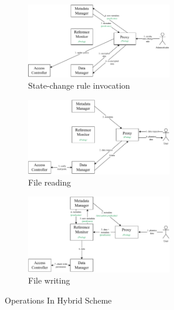 

\begin{figure}[t!]
    \centering

    \begin{subfigure}{\textwidth}
        \centering
        \includegraphics[width=0.7\textwidth]{assets/img2/hybrid_admin.pdf}
        \caption{State-change rule invocation}
        \label{fig:hybrid_structure.admin}
    \end{subfigure}
    \par\bigskip
    \begin{subfigure}{\textwidth}
        \centering
        \includegraphics[width=0.7\textwidth]{assets/img2/hybrid_read.pdf}
        \caption{File reading}
        \label{fig:hybrid_structure.read}
    \end{subfigure}
    \par\bigskip
    \begin{subfigure}{\textwidth}
        \centering
        \includegraphics[width=0.7\textwidth]{assets/img2/hybrid_write.pdf}
        \caption{File writing}
        \label{fig:hybrid_structure.write}
    \end{subfigure}

    \caption{Operations In Hybrid Scheme}
    \label{fig:hybrid_structure}
\end{figure}

